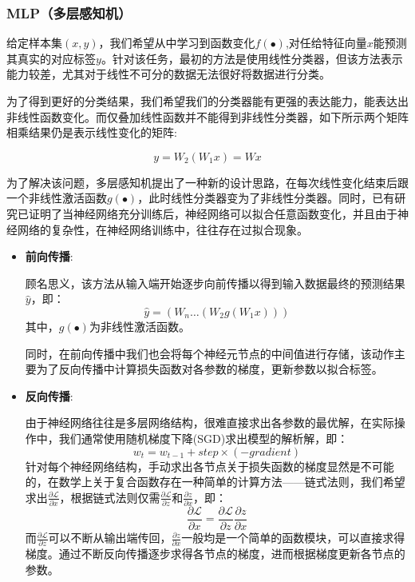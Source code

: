 \documentclass[10pt,a4paper,twoside]{article}
\numberwithin{figure}{section}%
\numberwithin{table}{section}%
\begin{document}
\subsubsection{MLP（多层感知机）}

给定样本集$(x,y)$，我们希望从中学习到函数变化$f(\bullet )$,对任给特征向量$x$能预测其真实的对应标签$y$。针对该任务，最初的方法是使用线性分类器，但该方法表示能力较差，尤其对于线性不可分的数据无法很好将数据进行分类。

为了得到更好的分类结果，我们希望我们的分类器能有更强的表达能力，能表达出非线性函数变化。而仅叠加线性函数并不能得到非线性分类器，如下所示两个矩阵相乘结果仍是表示线性变化的矩阵:

$$y = W_2(W_1x)=Wx$$

为了解决该问题，多层感知机提出了一种新的设计思路，在每次线性变化结束后跟一个非线性激活函数$g(\bullet )$，此时线性分类器变为了非线性分类器。同时，已有研究已证明了当神经网络充分训练后，神经网络可以拟合任意函数变化，并且由于神经网络的复杂性，在神经网络训练中，往往存在过拟合现象。

\begin{itemize}
    \item \textbf{前向传播}:

	顾名思义，该方法从输入端开始逐步向前传播以得到输入数据最终的预测结果$\hat{y}$，即：
    $$\hat{y} = (W_n\dots(W_2g(W_1x)))$$
    其中，$g(\bullet )$为非线性激活函数。

    同时，在前向传播中我们也会将每个神经元节点的中间值进行存储，该动作主要为了反向传播中计算损失函数对各参数的梯度，更新参数以拟合标签。
\end{itemize}

\begin{itemize}
    \item \textbf{反向传播}:

	由于神经网络往往是多层网络结构，很难直接求出各参数的最优解，在实际操作中，我们通常使用随机梯度下降(SGD)求出模型的解析解，即：
    $$w_t=w_{t-1} + step \times (-gradient)$$
    针对每个神经网络结构，手动求出各节点关于损失函数的梯度显然是不可能的，在数学上关于复合函数存在一种简单的计算方法——链式法则，我们希望求出$\frac{\partial \mathcal{L}}{\partial x} $，根据链式法则仅需$\frac{\partial \mathcal{L}}{\partial z} $和$\frac{\partial z}{\partial x} $，即：
    $$\frac{\partial \mathcal{L}}{\partial x}=\frac{\partial \mathcal{L}}{\partial z}\frac{\partial z}{\partial x}$$
    而$\frac{\partial \mathcal{L}}{\partial z}$可以不断从输出端传回，$\frac{\partial z}{\partial x} $一般均是一个简单的函数模块，可以直接求得梯度。通过不断反向传播逐步求得各节点的梯度，进而根据梯度更新各节点的参数。
\end{itemize}
\end{document}
